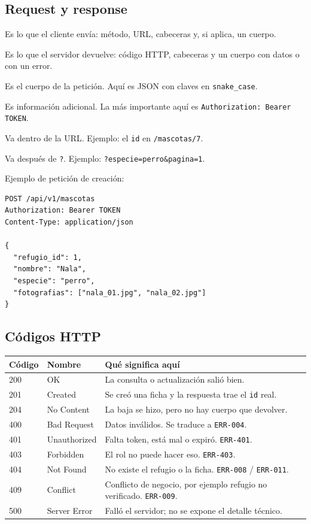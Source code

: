 \documentclass[11pt,a4paper]{article}
\newcommand{\code}[1]{\texttt{#1}}
\begin{document}
\subsection{Request y response}

\begin{description}[leftmargin=*,style=nextline]
  \item[Request.] Es lo que el cliente envía: método, URL, cabeceras y, si
    aplica, un cuerpo.
  \item[Response.] Es lo que el servidor devuelve: código HTTP, cabeceras y un
    cuerpo con datos o con un error.
  \item[Body.] Es el cuerpo de la petición. Aquí es JSON con claves en
    \code{snake\_case}.
  \item[Header.] Es información adicional. La más importante aquí es
    \code{Authorization: Bearer TOKEN}.
  \item[Path parameter.] Va dentro de la URL. Ejemplo: el \code{id} en
    \code{/mascotas/7}.
  \item[Query parameter.] Va después de \code{?}. Ejemplo:
    \code{?especie=perro\&pagina=1}.
\end{description}

Ejemplo de petición de creación:

\begin{lstlisting}
POST /api/v1/mascotas
Authorization: Bearer TOKEN
Content-Type: application/json

{
  "refugio_id": 1,
  "nombre": "Nala",
  "especie": "perro",
  "fotografias": ["nala_01.jpg", "nala_02.jpg"]
}
\end{lstlisting}

\subsection{Códigos HTTP}

\begin{tabularx}{\linewidth}{@{}p{1.5cm}p{1.8cm}X@{}}
\toprule
\textbf{Código} & \textbf{Nombre} & \textbf{Qué significa aquí} \\
\midrule
200 & OK & La consulta o actualización salió bien. \\
201 & Created & Se creó una ficha y la respuesta trae el \code{id} real. \\
204 & No Content & La baja se hizo, pero no hay cuerpo que devolver. \\
400 & Bad Request & Datos inválidos. Se traduce a \code{ERR-004}. \\
401 & Unauthorized & Falta token, está mal o expiró. \code{ERR-401}. \\
403 & Forbidden & El rol no puede hacer eso. \code{ERR-403}. \\
404 & Not Found & No existe el refugio o la ficha. \code{ERR-008} /
  \code{ERR-011}. \\
409 & Conflict & Conflicto de negocio, por ejemplo refugio no verificado.
  \code{ERR-009}. \\
500 & Server Error & Falló el servidor; no se expone el detalle técnico. \\
\bottomrule
\end{tabularx}
\end{document}
